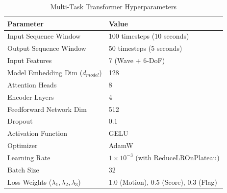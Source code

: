 \begin{table}[H]
\centering
\caption{Multi-Task Transformer Hyperparameters}
\label{tab:hyperparameters}
\vspace{0.2cm}
\begin{tabular}{@{}ll@{}}
\toprule
\textbf{Parameter} & \textbf{Value} \\ \midrule
Input Sequence Window & 100 timesteps ($10$ seconds) \\
Output Sequence Window & 50 timesteps ($5$ seconds) \\
Input Features & 7 (Wave + 6-DoF) \\
Model Embedding Dim ($d_{model}$) & 128 \\
Attention Heads & 8 \\
Encoder Layers & 4 \\
Feedforward Network Dim & 512 \\
Dropout & 0.1 \\
Activation Function & GELU \\
Optimizer & AdamW \\
Learning Rate & $1 \times 10^{-3}$ (with ReduceLROnPlateau) \\
Batch Size & 32 \\
Loss Weights ($\lambda_1, \lambda_2, \lambda_3$) & 1.0 (Motion), 0.5 (Score), 0.3 (Flag) \\ \bottomrule
\end{tabular}
\end{table}

